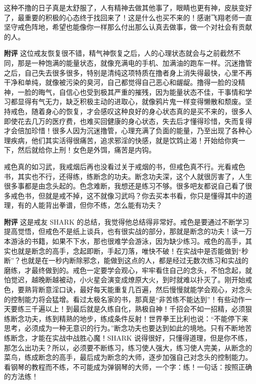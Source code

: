 \begin{case}
    这种不撸的日子真是太舒服了，人有精神去做其他事了，眼睛也更有神，皮肤变好了，最重要的积极的心态终于找回来了！这是什么也买不来的！感谢飞翔老师一直坚守戒色阵地，希望也能像你一样那么付出那么认真去做事，做一个对社会有贡献的人。

    \textbf{附评} 这位戒友恢复很不错，精气神恢复之后，人的心理状态就会与之前截然不同，那是一种饱满的能量状态，就像充满电的手机、加满油的跑车一样。沉迷撸管之后，自己失去很多很多，特别是清纯这项特质在撸者身上消失得最快，心里不再干净和单纯，就像被污染的臭河，自己都觉得自己恶心和龌龊。撸得一脸的没精神，一脸的晦气，自信心也受到极其严重的摧残，因为能量状态不佳，干事情和学习都显得有气无力，缺乏积极主动的进取心，就像鸦片鬼一样变得懒散和颓废。坚持戒色，随着身心的恢复，才会感叹这种良好的身心状态真的是买不来的，很多人即使花去几万的医疗费，也难买回健康的身心状态，失去后才懂得珍惜，失而复得才会倍加珍惜！很多人因为沉迷撸管，心理充满了负面的能量，乃至出现了各种心理疾病，他们其实活得很痛苦，追求邪淫的快感，就是饮鸩止渴！开始给你爽一下，然后就给你上刑！女色是外饵，痛苦是内钩。
\end{case}

\begin{case}
    戒色真的如习武，我戒烟后再也没看过关于戒烟的书，但戒色真不行。光看戒色书，其实也不行，还得练，练断念的功夫。断念功夫深，这个人就很厉害了，人生很多事都是由念头起的。色念难断，我想还是练习不够。很多吧友都说自己看了很多戒色书，但就是戒不掉，这不就像习武吗？你去买本书看，你只是懂得其中的道理，有的人能背出拳谱，但你不练，怎么能有功夫？

    \textbf{附评} 这是戒友 SHARK 的总结，我觉得他总结得非常好。戒色是要通过不断学习提高觉悟，但戒色不是纸上谈兵，也有很实战的部分，那就是断念的功夫！读一万本游泳的书籍，如果不下水，那也很难学会游泳，因为缺少练习。戒色的高手，其实也就是断念的高手，念起即断，手起刀落，唯快不破！在实战中是否能做到“秒断”？也就是在一秒内断除邪念，能做到这点的人，都是经过无数次练习和实战的磨练，才最终做到的。戒色一定要学会观心，牢牢看住自己的念头，不怕念起，就怕觉迟，越晚断越被动，小火星会演变成燎原大火，到时就难以扑灭了。刚开始戒色，要熟背断意淫口诀，最好每天能重复几百遍，然后慢慢就能学会观心，对念头的控制能力将会猛增。看过太极名家的书，那真是“非苦练不能达到”！有些动作一天要练三千遍以上！到最后就是久练自化，熟极自神！千招会不如一招精，必须狠练断念功夫，练到精熟的地步，练成条件反射！世界拳王比利也说：“不能停下来思考，必须成为一种无意识的行为。”断念功夫也要达到如此的境地。只有不断地苦练断念，才能在实战中战胜心魔！SHARK 说得很好，只懂得道理，但是你不练，那怎么出功夫？所以，必须要不断练习，练习使人强大，练习使人完美，从断念的菜鸟，练成断念的高手，最后成为断念的大师，逐步加强自己对念头的控制能力。看钢琴的教程而不练，不可能成为弹钢琴的大师，一个字：练！一句话：按照正确的方法练！
\end{case}

